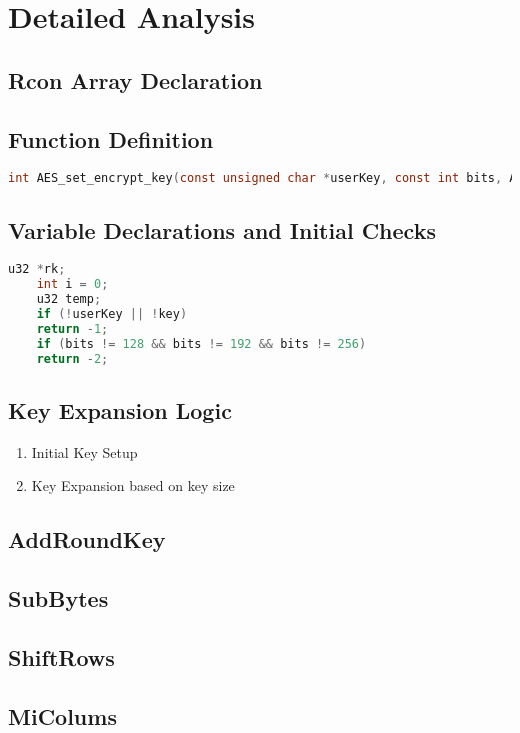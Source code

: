 \section{Detailed Analysis}
\subsection{Rcon Array Declaration}


\subsection{Function Definition}
\begin{lstlisting}[language=C]
	int AES_set_encrypt_key(const unsigned char *userKey, const int bits, AES_KEY *key);
\end{lstlisting}

\subsection{Variable Declarations and Initial Checks}
\begin{lstlisting}[language=C]
	u32 *rk;
	int i = 0;
	u32 temp;
	if (!userKey || !key)
	return -1;
	if (bits != 128 && bits != 192 && bits != 256)
	return -2;
\end{lstlisting}

\subsection{Key Expansion Logic}
\begin{enumerate}
	\item Initial Key Setup
	\item Key Expansion based on key size
\end{enumerate}


\subsection{AddRoundKey}


\subsection{SubBytes}
\subsection{ShiftRows}
\subsection{MiColums}